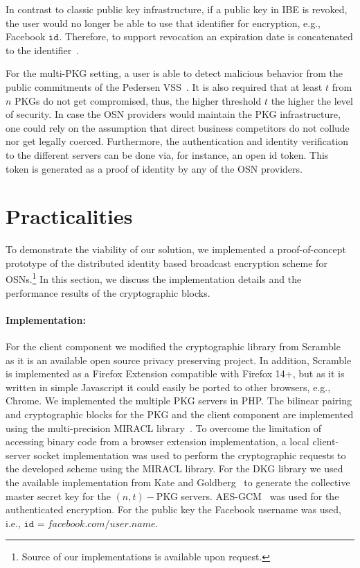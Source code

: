 \documentclass[journal]{IEEEtran}
\newcommand{\id}[1]{\ensuremath{\mathtt{id}_{#1}}}
\begin{document}
In contrast to classic public key infrastructure, if a public key in IBE is revoked, the user would no longer be able to use that identifier for encryption, e.g., Facebook \id{}. Therefore, to support revocation an expiration date is concatenated to the identifier~\cite{BonehFranklinIBE}. 

For the multi-PKG setting, a user is able to detect malicious behavior from the public commitments of the Pedersen VSS~\cite{Pedersen:1991:NIS:646756.705507}. It is also required that at least $t$ from $n$ PKGs do not get compromised, thus, the higher threshold $t$ the higher the level of security. In case the OSN providers would maintain the PKG infrastructure, one could rely on the assumption that direct business competitors do not collude nor get legally coerced. Furthermore, the authentication and identity verification to the different servers can be done via, for instance, an open id token. This token is generated as a proof of identity by any of the OSN providers.


\section{Practicalities}\label{sec:impl}
To demonstrate the viability of our solution, we implemented a proof-of-concept prototype of the distributed identity based broadcast encryption scheme for OSNs.\footnote{Source of our implementations is available upon request.} In this section, we discuss the implementation details and the performance results of the cryptographic blocks.

\paragraph{Implementation:}
For the client component we modified the cryptographic library from Scramble~\cite{BeatoScramble} as it is an available open source privacy preserving project. In addition, Scramble is implemented as a Firefox Extension compatible with Firefox 14+, but as it is written in simple Javascript it could easily be ported to other browsers, e.g., Chrome. 
We implemented the multiple PKG servers in PHP.
The bilinear pairing and cryptographic blocks for the PKG and the client component are implemented using the multi-precision {MIRACL} library~\cite{scott2003miracl}. To overcome the limitation of accessing binary code from a browser extension implementation, a local client-server socket implementation was used to perform the cryptographic requests to the developed scheme using the {MIRACL} library.
For the DKG library we used the available implementation from Kate and Goldberg~\cite{DBLP:conf/icdcs/KateG09,dkg-software} to generate the collective master secret key for the $(n,t)-$PKG servers. AES-GCM~\cite{rfc5288} was used for the authenticated encryption. For the public key the Facebook username was used, i.e., $\id{}=facebook.com/user.name$. 
\end{document}
